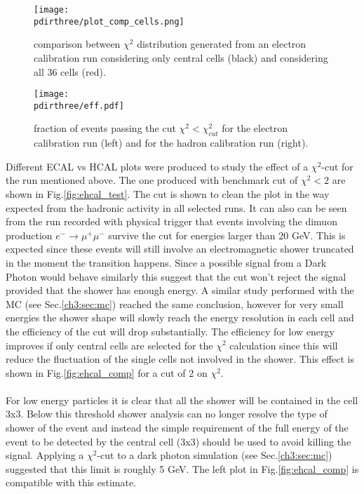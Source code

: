 \begin{figure}[h!]
  \begin{center}
    \texttt{[image: \\pdirthree/plot\_comp\_cells.png]}
  \end{center}
  \caption[comparison between $\chi^2$ distribution for different ECAL configurations]{comparison between $\chi^2$ distribution generated from an electron calibration run considering only central cells (black) and considering all 36 cells (red).}
  \label{fig:chi}
\end{figure}

\begin{figure}[h!]
  \begin{center}
    \texttt{[image: \\pdirthree/eff.pdf]}
  \end{center}
  \caption[fraction of events passing the $\chi^2$ cut]{fraction of events passing the cut $\chi^2 < \chi^2_{cut}$
    for the electron calibration run (left) and for the hadron calibration run (right).}
  \label{fig:eff}
\end{figure}

\clearpage

Different ECAL vs HCAL plots were produced to study the effect of a
$\chi^2$-cut for the run mentioned above. The one produced with
benchmark cut of $\chi^2 < 2$ are shown in
Fig.\ref{fig:ehcal_test}. The cut is shown to clean the plot in the
way expected from the hadronic activity in all selected runs. It can also
can be seen from the run recorded with physical trigger that events involving the dimuon
production $e^- \to \mu^+\mu^-$ survive the cut for energies larger
than 20 GeV.  This is expected since these events will still involve
an electromagnetic shower truncated in the moment the transition
happens. Since a possible signal from a Dark Photon would behave
similarly this suggest that the cut won't reject the signal provided
that the shower has enough energy. A similar study performed with the
MC (see Sec.\ref{ch3:sec:mc}) reached the same conclusion, however for
very small energies the shower shape will slowly reach the energy
resolution in each cell and the efficiency of the cut will drop
substantially.  The efficiency for low energy improves if only central
cells are selected for the $\chi^2$ calculation since this will reduce
the fluctuation of the single cells not involved in the shower. This
effect is shown in Fig.\ref{fig:ehcal_comp} for a cut of 2 on $\chi^2$.
\\
\\
For low energy particles it is clear that all the shower will be
contained in the cell 3x3. Below this threshold shower analysis can no
longer resolve the type of shower of the event and instead the simple
requirement of the full energy of the event to be detected by the
central cell (3x3) should be used to avoid killing the
signal. Applying a $\chi^2$-cut to a dark photon simulation (see
Sec.\ref{ch3:sec:mc}) suggested that this limit is roughly 5 GeV.  The
left plot in Fig.\ref{fig:ehcal_comp} is compatible with this
estimate.


